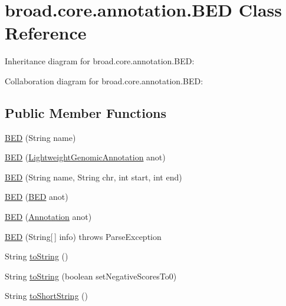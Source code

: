 \hypertarget{classbroad_1_1core_1_1annotation_1_1_b_e_d}{\section{broad.\+core.\+annotation.\+B\+E\+D Class Reference}
\label{classbroad_1_1core_1_1annotation_1_1_b_e_d}
}


Inheritance diagram for broad.\+core.\+annotation.\+B\+E\+D\+:


Collaboration diagram for broad.\+core.\+annotation.\+B\+E\+D\+:
\subsection*{Public Member Functions}
\begin{DoxyCompactItemize}
\item 
\hyperlink{classbroad_1_1core_1_1annotation_1_1_b_e_d_a6214caa6150c2bc316b5b484497248d0}{B\+E\+D} (String name)
\item 
\hyperlink{classbroad_1_1core_1_1annotation_1_1_b_e_d_ac688b83c3eb09b08c7fd0c8fcdd29c62}{B\+E\+D} (\hyperlink{interfacebroad_1_1core_1_1annotation_1_1_lightweight_genomic_annotation}{Lightweight\+Genomic\+Annotation} anot)
\item 
\hyperlink{classbroad_1_1core_1_1annotation_1_1_b_e_d_ab77462b67a04c345fcc9502dd7c03c00}{B\+E\+D} (String name, String chr, int start, int end)
\item 
\hyperlink{classbroad_1_1core_1_1annotation_1_1_b_e_d_a321e1077e2c191850029fa82add2b48a}{B\+E\+D} (\hyperlink{classbroad_1_1core_1_1annotation_1_1_b_e_d}{B\+E\+D} anot)
\item 
\hyperlink{classbroad_1_1core_1_1annotation_1_1_b_e_d_aa40e839ac31bd95f8ce8ca0ee00a926a}{B\+E\+D} (\hyperlink{interfaceumms_1_1core_1_1annotation_1_1_annotation}{Annotation} anot)
\item 
\hyperlink{classbroad_1_1core_1_1annotation_1_1_b_e_d_a48c9b666d9b1d2bab7b4f1a20c49d795}{B\+E\+D} (String\mbox{[}$\,$\mbox{]} info)  throws Parse\+Exception 
\item 
String \hyperlink{classbroad_1_1core_1_1annotation_1_1_b_e_d_af9b291a3ae36c64443aa5e5b13e55004}{to\+String} ()
\item 
String \hyperlink{classbroad_1_1core_1_1annotation_1_1_b_e_d_a07603f8f6e0de6f886243be3dc82aef7}{to\+String} (boolean set\+Negative\+Scores\+To0)
\item 
String \hyperlink{classbroad_1_1core_1_1annotation_1_1_b_e_d_a0cbdd3d7ac3b0b72c8afa0a2a15cf301}{to\+Short\+String} ()

\end{DoxyCompactItemize}
